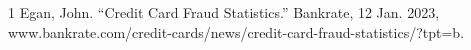 \documentclass[12pt, letterpaper]{article}
\begin{document}
\begin{thebibliography} {1}
    Egan, John. “Credit Card Fraud Statistics.” Bankrate, 12 Jan. 2023, www.bankrate.com/credit-cards/news/credit-card-fraud-statistics/?tpt=b.

    
\end{thebibliography}
    
\end{document}
